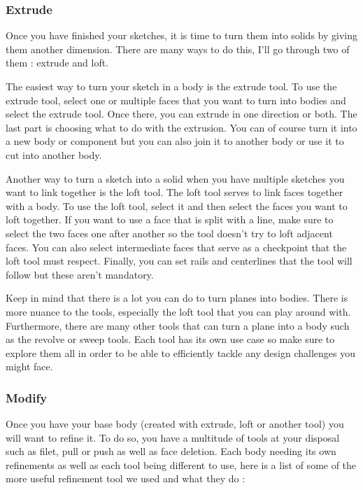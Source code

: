 \subsubsection{Extrude}

Once you have finished your sketches, it is time to turn them into solids by giving them another dimension. There are many ways to do this, I’ll go through two of them : extrude and loft. \par

The easiest way to turn your sketch in a body is the extrude tool. To use the extrude tool, select one or multiple faces that you want to turn into bodies and select the extrude tool. Once there, you can extrude in one direction or both. The last part is choosing what to do with the extrusion. You can of course turn it into a new body or component but you can also join it to another body or use it to cut into another body. \par

Another way to turn a sketch into a solid when you have multiple sketches you want to link together is the loft tool. The loft tool serves to link faces together with a body. To use the loft tool, select it and then select the faces you want to loft together. If you want to use a face that is split with a line, make sure to select the two faces one after another so the tool doesn’t try to loft adjacent faces. You can also select intermediate faces that serve as a checkpoint that the loft tool must respect. Finally, you can set rails and centerlines that the tool will follow but these aren't mandatory. \par

Keep in mind that there is a lot you can do to turn planes into bodies. There is more nuance to the tools, especially the loft tool that you can play around with. Furthermore, there are many other tools that can turn a plane into a body such as the revolve or sweep tools. Each tool has its own use case so make sure to explore them all in order to be able to efficiently tackle any design challenges you might face. \par

\subsubsection{Modify}

Once you have your base body (created with extrude, loft or another tool) you will want to refine it. To do so, you have a multitude of tools at your disposal such as filet, pull or push as well as face deletion. Each body needing its own refinements as well as each tool being different to use, here is a list of some of the more useful refinement tool we used and what they do : 

